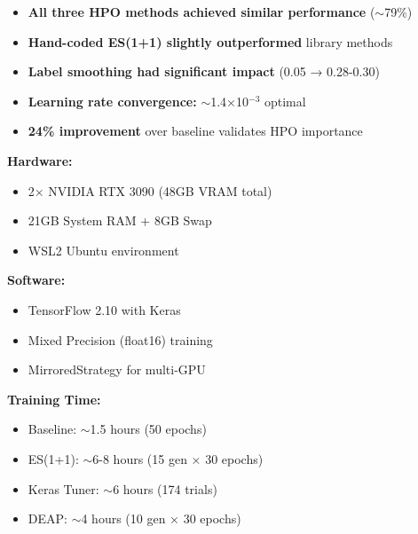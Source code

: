 \documentclass[a0,landscape]{a0poster}
\begin{document}
\hfill
\begin{minipage}[t]{0.32\linewidth}

\begin{tcolorbox}[boxstyle, title=KEY FINDINGS]
\begin{itemize}[leftmargin=*]
    \item \textbf{All three HPO methods achieved similar performance} ($\sim$79\%)
    \item \textbf{Hand-coded ES(1+1) slightly outperformed} library methods
    \item \textbf{Label smoothing had significant impact} (0.05 → 0.28-0.30)
    \item \textbf{Learning rate convergence:} $\sim$1.4×10$^{-3}$ optimal
    \item \textbf{24\% improvement} over baseline validates HPO importance
\end{itemize}
\end{tcolorbox}

\vspace{0.5cm}

\begin{tcolorbox}[boxstyle, title=TRAINING CONFIGURATION]
\textbf{Hardware:}
\begin{itemize}[leftmargin=*,noitemsep]
    \item 2× NVIDIA RTX 3090 (48GB VRAM total)
    \item 21GB System RAM + 8GB Swap
    \item WSL2 Ubuntu environment
\end{itemize}

\textbf{Software:}
\begin{itemize}[leftmargin=*,noitemsep]
    \item TensorFlow 2.10 with Keras
    \item Mixed Precision (float16) training
    \item MirroredStrategy for multi-GPU
\end{itemize}

\textbf{Training Time:}
\begin{itemize}[leftmargin=*,noitemsep]
    \item Baseline: $\sim$1.5 hours (50 epochs)
    \item ES(1+1): $\sim$6-8 hours (15 gen × 30 epochs)
    \item Keras Tuner: $\sim$6 hours (174 trials)
    \item DEAP: $\sim$4 hours (10 gen × 30 epochs)
\end{itemize}


\end{tcolorbox}
\end{minipage}
\end{document}
